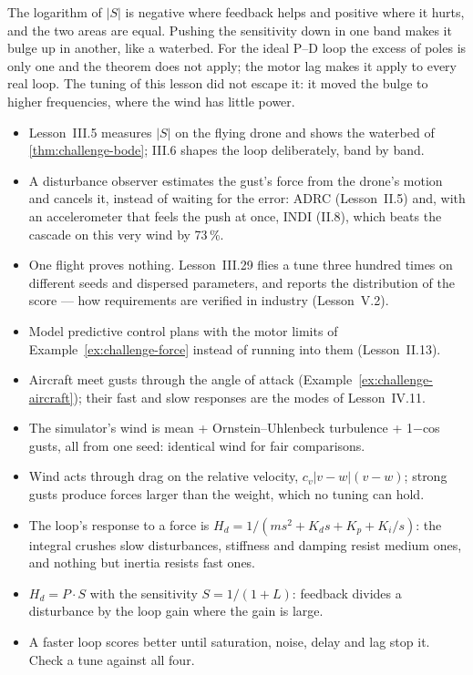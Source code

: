 The logarithm of $|S|$ is negative where feedback helps and positive where it hurts, and the two areas are equal. Pushing the sensitivity down in one band makes it bulge up in another, like a waterbed. For the ideal P–D loop the excess of poles is only one and the theorem does not apply; the motor lag makes it apply to every real loop. The tuning of this lesson did not escape it: it moved the bulge to higher frequencies, where the wind has little power.

\begin{lookahead}
\begin{itemize}[leftmargin=1.2em]
  \item Lesson~III.5 measures $|S|$ on the flying drone and shows the waterbed of \cref{thm:challenge-bode}; III.6 shapes the loop deliberately, band by band.
  \item A disturbance observer estimates the gust's force from the drone's motion and cancels it, instead of waiting for the error: ADRC (Lesson~II.5) and, with an accelerometer that feels the push at once, INDI (II.8), which beats the cascade on this very wind by 73\,\%.
  \item One flight proves nothing. Lesson~III.29 flies a tune three hundred times on different seeds and dispersed parameters, and reports the distribution of the score — how requirements are verified in industry (Lesson~V.2).
  \item Model predictive control plans with the motor limits of Example~\ref{ex:challenge-force} instead of running into them (Lesson~II.13).
  \item Aircraft meet gusts through the angle of attack (Example~\ref{ex:challenge-aircraft}); their fast and slow responses are the modes of Lesson~IV.11.
\end{itemize}
\end{lookahead}

\begin{remember}
\begin{itemize}
  \item The simulator's wind is mean + Ornstein–Uhlenbeck turbulence + 1−cos gusts, all from one seed: identical wind for fair comparisons.
  \item Wind acts through drag on the relative velocity, $c_v|v - w|(v - w)$; strong gusts produce forces larger than the weight, which no tuning can hold.
  \item The loop's response to a force is $H_d = 1/(ms^2 + K_ds + K_p + K_i/s)$: the integral crushes slow disturbances, stiffness and damping resist medium ones, and nothing but inertia resists fast ones.
  \item $H_d = P \cdot S$ with the sensitivity $S = 1/(1 + L)$: feedback divides a disturbance by the loop gain where the gain is large.
  \item A faster loop scores better until saturation, noise, delay and lag stop it. Check a tune against all four.
\end{itemize}
\end{remember}

